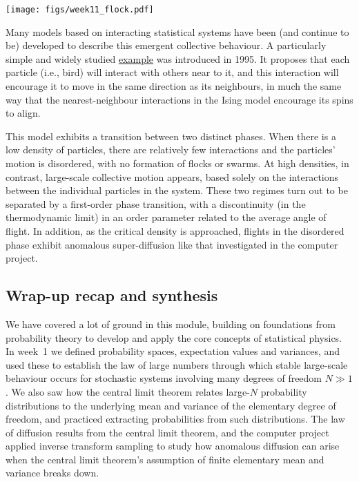 \begin{center}\texttt{[image: figs/week11\_flock.pdf]}\end{center}

Many models based on interacting statistical systems have been (and continue to be) developed to describe this emergent collective behaviour.
A particularly simple and widely studied \href{https://en.wikipedia.org/wiki/Vicsek_model}{example} was introduced in 1995.
It proposes that each particle (i.e., bird) will interact with others near to it, and this interaction will encourage it to move in the same direction as its neighbours, in much the same way that the nearest-neighbour interactions in the Ising model encourage its spins to align.

This model exhibits a transition between two distinct phases.
When there is a low density of particles, there are relatively few interactions and the particles' motion is disordered, with no formation of flocks or swarms.
At high densities, in contrast, large-scale collective motion appears, based solely on the interactions between the individual particles in the system.
These two regimes turn out to be separated by a first-order phase transition, with a discontinuity (in the thermodynamic limit) in an order parameter related to the average angle of flight.
In addition, as the critical density is approached, flights in the disordered phase exhibit anomalous super-diffusion like that investigated in the computer project.



\subsection{Wrap-up recap and synthesis}
We have covered a lot of ground in this module, building on foundations from probability theory to develop and apply the core concepts of statistical physics.
In week~1 we defined probability spaces, expectation values and variances, and used these to establish the law of large numbers through which stable large-scale behaviour occurs for stochastic systems involving many degrees of freedom $N \gg 1$.
We also saw how the central limit theorem relates large-$N$ probability distributions to the underlying mean and variance of the elementary degree of freedom, and practiced extracting probabilities from such distributions.
The law of diffusion results from the central limit theorem, and the computer project applied inverse transform sampling to study how anomalous diffusion can arise when the central limit theorem's assumption of finite elementary mean and variance breaks down.

